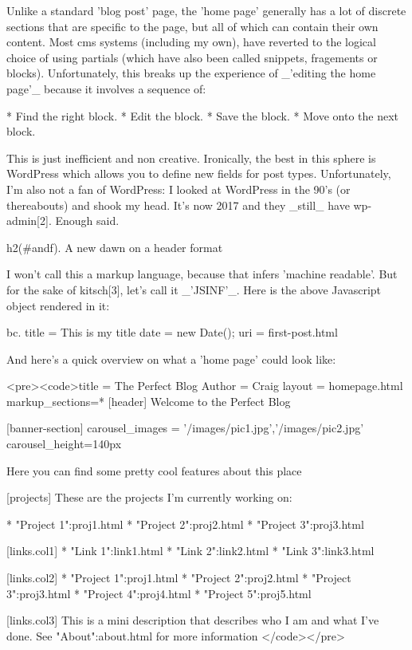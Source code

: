 Unlike a standard 'blog post' page, the 'home page' generally has a lot of discrete sections that are specific to the page, but all of which can contain their own content. Most cms systems (including my own), have reverted to the logical choice of using partials (which have also been called snippets, fragements or blocks). Unfortunately, this breaks up the experience of _'editing the home page'_ because it involves a sequence of:

* Find the right block.
* Edit the block.
* Save the block.
* Move onto the next block.

This is just inefficient and non creative. Ironically, the best in this sphere is WordPress which allows you to define new fields for post types. Unfortunately, I'm also not a fan of WordPress: I looked at WordPress in the 90's (or thereabouts) and shook my head. It's now 2017 and they _still_ have wp-admin[2]. Enough said. 

h2(#andf). A new dawn on a header format

I won't call this a markup language, because that infers 'machine readable'. But for the sake of kitsch[3], let's call it _'JSINF'_. Here is the above Javascript object rendered in it:

bc.
title = This is my title
date = {new Date();}
uri = first-post.html

And here's a quick overview on what a 'home page' could look like:


<pre><code>title = The Perfect Blog
Author = Craig
layout = homepage.html
markup_sections=*
[header]
Welcome to the Perfect Blog

[banner-section]
carousel_images = '/images/pic1.jpg','/images/pic2.jpg'
carousel_height=140px

Here you can find some pretty cool features about this place

[projects]
These are the projects I'm currently working on:

* "Project 1":proj1.html
* "Project 2":proj2.html
* "Project 3":proj3.html

[links.col1]
* "Link 1":link1.html
* "Link 2":link2.html
* "Link 3":link3.html


[links.col2]
* "Project 1":proj1.html
* "Project 2":proj2.html
* "Project 3":proj3.html
* "Project 4":proj4.html
* "Project 5":proj5.html


[links.col3]
This is a mini description that describes who I am and what I've done. See "About":about.html for more information
</code></pre>

